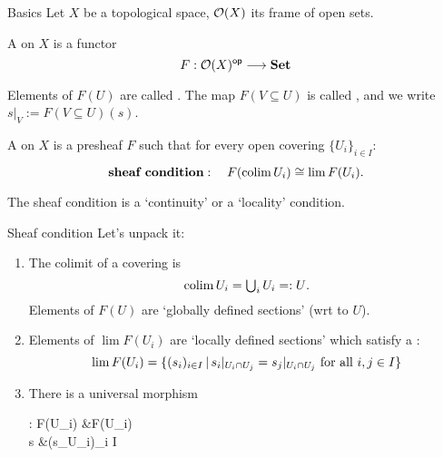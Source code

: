 \begin{frame}{Basics}
	Let $X$ be a topological space, $\mathcal{O}(X)$ its frame of open sets.

	\begin{definition}
		A  on $X$ is a functor
		\begin{equation*}
			F: \mathcal{O}(X)^{\mathsf{op}} \longrightarrow \mathbf{Set}
		\end{equation*}
	\end{definition}

	Elements of $F(U)$ are called . The map $F(V \subseteq U)$ is called , and we write $s\vert_V := F(V \subseteq U)(s)$.

	\begin{definition}
		A  on $X$ is a presheaf $F$ such that for every open covering $\{U_i\}_{i \in I}$:
		\begin{equation*}
			\textbf{sheaf condition}: \quad F(\operatorname*{colim} U_i) \overset{}{\cong} \lim F(U_i).
		\end{equation*}
	\end{definition}
	The sheaf condition is a `continuity' or a `locality' condition.
\end{frame}

\begin{frame}{Sheaf condition}
	Let's unpack it:
	\vfill
	\begin{enumerate}
		\item The colimit of a covering is
		\begin{equation*}
			{\textstyle \operatorname*{colim}U_i = \bigcup_i U_i =: U}.
		\end{equation*}
		Elements of $F(U)$ are `globally defined sections' (wrt to $U$).
		\vspace{3ex}
		\item Elements of $\lim F(U_i)$ are `locally defined sections' which satisfy a :
		\begin{equation*}
			\lim F(U_i) = \{(s_i)_{i \in I} \,|\, s_i \vert_{U_i \cap U_j} = s_j \vert_{U_i \cap U_j}\ \text{for all $i,j \in I$}\}
		\end{equation*}
		\vspace{1ex}
		\item There is a universal morphism
		\begin{eqalign*}
			\varphi : F(\colim U_i) &\longto \lim F(U_i)\\
			s &\longmapsto (s\vert_{U_i})_{i \in I}
		\end{eqalign*}
	\end{enumerate}
	\vfill
\end{frame}

